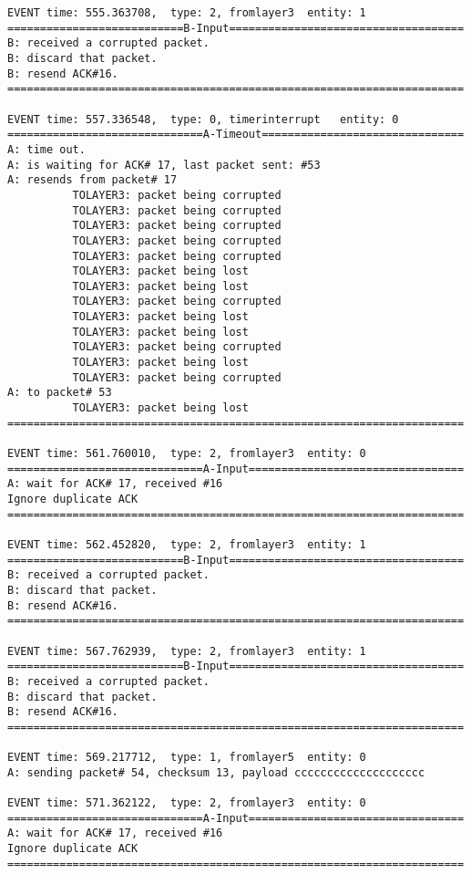 \documentclass[12pt]{article}
\begin{document}
\begin{verbatim}
EVENT time: 555.363708,  type: 2, fromlayer3  entity: 1
===========================B-Input====================================
B: received a corrupted packet.
B: discard that packet.
B: resend ACK#16.
======================================================================

EVENT time: 557.336548,  type: 0, timerinterrupt   entity: 0
==============================A-Timeout===============================
A: time out. 
A: is waiting for ACK# 17, last packet sent: #53
A: resends from packet# 17 
          TOLAYER3: packet being corrupted
          TOLAYER3: packet being corrupted
          TOLAYER3: packet being corrupted
          TOLAYER3: packet being corrupted
          TOLAYER3: packet being corrupted
          TOLAYER3: packet being lost
          TOLAYER3: packet being lost
          TOLAYER3: packet being corrupted
          TOLAYER3: packet being lost
          TOLAYER3: packet being lost
          TOLAYER3: packet being corrupted
          TOLAYER3: packet being lost
          TOLAYER3: packet being corrupted
A: to packet# 53
          TOLAYER3: packet being lost
======================================================================

EVENT time: 561.760010,  type: 2, fromlayer3  entity: 0
==============================A-Input=================================
A: wait for ACK# 17, received #16
Ignore duplicate ACK
======================================================================

EVENT time: 562.452820,  type: 2, fromlayer3  entity: 1
===========================B-Input====================================
B: received a corrupted packet.
B: discard that packet.
B: resend ACK#16.
======================================================================

EVENT time: 567.762939,  type: 2, fromlayer3  entity: 1
===========================B-Input====================================
B: received a corrupted packet.
B: discard that packet.
B: resend ACK#16.
======================================================================

EVENT time: 569.217712,  type: 1, fromlayer5  entity: 0
A: sending packet# 54, checksum 13, payload cccccccccccccccccccc

EVENT time: 571.362122,  type: 2, fromlayer3  entity: 0
==============================A-Input=================================
A: wait for ACK# 17, received #16
Ignore duplicate ACK
======================================================================


\end{verbatim}
\end{document}
